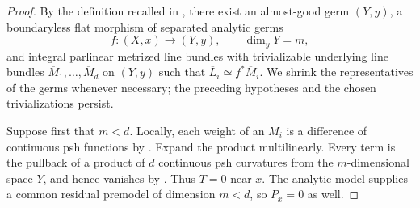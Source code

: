 \begin{proof}
By the definition recalled in , there exist an
almost-good germ $(Y,y)$, a boundaryless flat morphism of separated
analytic germs
\[
 f:(X,x)\longrightarrow(Y,y),\qquad \dim_yY=m,
\]
and integral parlinear metrized line bundles with trivializable underlying
line bundles
$\overline M_1,\ldots,\overline M_d$ on $(Y,y)$ such that
$\overline L_i\simeq f^*\overline M_i$.  We shrink the representatives
of the germs whenever necessary; the preceding hypotheses and the chosen
trivializations persist.

Suppose first that $m<d$.  Locally, each weight of an
$\overline M_i$ is a difference of continuous psh functions by
.  Expand the product multilinearly.  Every
term is the pullback of a product of $d$ continuous psh curvatures from
the $m$-dimensional space $Y$, and hence vanishes by
.  Thus $T=0$ near $x$.
The analytic model supplies a common residual premodel of dimension
$m<d$, so $P_x=0$ as well.


\end{proof}
